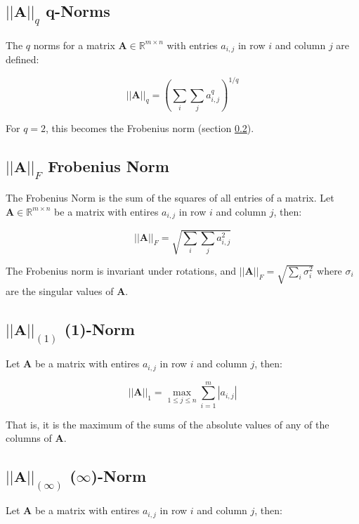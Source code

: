 \subsection{$||\mathbf{A}||_q$ q-Norms}
The $q$ norms for a matrix $\mathbf{A} \in \mathbb{R}^{m\times n}$ with entries $a_{i,j}$ in row $i$ and column $j$ are defined:

\begin{equation}
||\mathbf{A}||_q = \left(\sum_{i}\sum_{j} a^q_{i,j}\right)^{1/q}
\end{equation}

For $q=2$, this becomes the Frobenius norm (section \ref{frobenius}). 

\subsection{$||\mathbf{A}||_F$ Frobenius Norm}
\label{frobenius}
The Frobenius Norm is the sum of the squares of all entries of a matrix. Let $\mathbf{A} \in \mathbb{R}^{m\times n}$ be a matrix with entires $a_{i,j}$ in row $i$ and column $j$, then:

\begin{equation}
||\mathbf{A}||_F = \sqrt{\sum_{i}\sum_{j} a^2_{i,j}}
\end{equation}

The Frobenius norm is invariant under rotations, and $||\mathbf{A}||_F = \sqrt{\sum_i \sigma_i^2}$ where $\sigma_i$ are the singular values of $\mathbf{A}$. 

\subsection{$||\mathbf{A}||_{(1)}$ (1)-Norm}
Let $\mathbf{A}$ be a matrix with entires $a_{i,j}$ in row $i$ and column $j$, then:

\begin{equation}
||\mathbf{A}||_1 = \max_{1\leq j \leq n} \sum^m_{i=1} |a_{i,j} |
\end{equation}

That is, it is the maximum of the sums of the absolute values of any of the columns of $\mathbf{A}$.

\subsection{$||\mathbf{A}||_{(\infty)}$ ($\infty$)-Norm}

Let $\mathbf{A}$ be a matrix with entires $a_{i,j}$ in row $i$ and column $j$, then:

